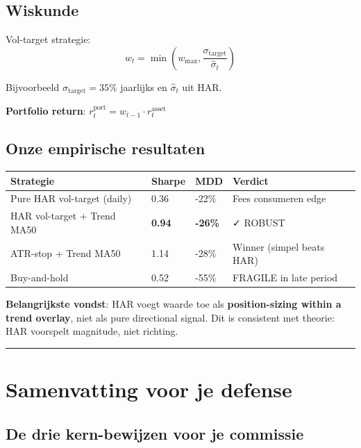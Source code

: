 \hypertarget{wiskunde-5}{%
\subsection{Wiskunde}\label{wiskunde-5}}

Vol-target strategie:
\[w_t = \min\left(w_{\max}, \frac{\sigma_{\text{target}}}{\hat\sigma_t}\right)\]

Bijvoorbeeld \(\sigma_{\text{target}} = 35\%\) jaarlijks en \(\hat\sigma_t\) uit HAR.

\textbf{Portfolio return}: \(r_t^{\text{port}} = w_{t-1} \cdot r_t^{\text{asset}}\)

\hypertarget{onze-empirische-resultaten}{%
\subsection{Onze empirische resultaten}\label{onze-empirische-resultaten}}

\begin{longtable}[]{@{}llll@{}}
\toprule
Strategie & Sharpe & MDD & Verdict \\
\midrule
\endhead
Pure HAR vol-target (daily) & 0.36 & -22\% & Fees consumeren edge \\
HAR vol-target + Trend MA50 & \textbf{0.94} & \textbf{-26\%} & ✓ ROBUST \\
ATR-stop + Trend MA50 & 1.14 & -28\% & Winner (simpel beats HAR) \\
Buy-and-hold & 0.52 & -55\% & FRAGILE in late period \\
\bottomrule
\end{longtable}

\textbf{Belangrijkste vondst}: HAR voegt waarde toe als \textbf{position-sizing within a trend overlay}, niet als pure directional signal. Dit is consistent met theorie: HAR voorspelt magnitude, niet richting.

\begin{center}\rule{0.5\linewidth}{0.5pt}\end{center}

\hypertarget{samenvatting-voor-je-defense}{%
\section{Samenvatting voor je defense}\label{samenvatting-voor-je-defense}}

\hypertarget{de-drie-kern-bewijzen-voor-je-commissie}{%
\subsection{De drie kern-bewijzen voor je commissie}\label{de-drie-kern-bewijzen-voor-je-commissie}}

